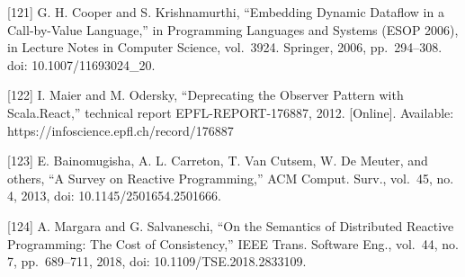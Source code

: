 \documentclass[
  10
]{article}
\begin{document}
{[}121{]} G. H. Cooper and S. Krishnamurthi, ``Embedding Dynamic Dataflow in a
Call-by-Value Language,'' in Programming Languages and Systems (ESOP 2006), in
Lecture Notes in Computer Science, vol.~3924. Springer, 2006, pp.~294--308. doi:
10.1007/11693024\_20.

{[}122{]} I. Maier and M. Odersky, ``Deprecating the Observer Pattern with
Scala.React,'' technical report EPFL-REPORT-176887, 2012. {[}Online{]}. Available:
https://infoscience.epfl.ch/record/176887

{[}123{]} E. Bainomugisha, A. L. Carreton, T. Van Cutsem, W. De Meuter, and others,
``A Survey on Reactive Programming,'' ACM Comput. Surv., vol.~45, no. 4, 2013, doi:
10.1145/2501654.2501666.

{[}124{]} A. Margara and G. Salvaneschi, ``On the Semantics of Distributed Reactive
Programming: The Cost of Consistency,'' IEEE Trans. Software Eng., vol.~44, no. 7,
pp.~689--711, 2018, doi: 10.1109/TSE.2018.2833109.
\end{document}
